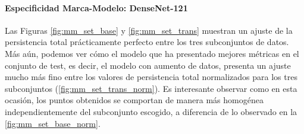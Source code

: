 \paragraph{Especificidad Marca-Modelo: DenseNet-121}

Las Figuras \ref{fig:mm_set_base} y \ref{fig:mm_set_trans} muestran un ajuste de
la persistencia total prácticamente perfecto entre los tres subconjuntos de
datos. Más aún, podemos ver cómo el modelo que ha presentado mejores métricas en
el conjunto de test, es decir, el modelo con aumento de datos, presenta un ajuste
mucho más fino entre los valores de persistencia total normalizados para los tres
subconjuntos (\autoref{fig:mm_set_trans_norm}). Es interesante observar como en
esta ocasión, los puntos obtenidos se comportan de manera más homogénea independientemente
del subconjunto escogido, a diferencia de lo observado en la
\autoref{fig:mm_set_base_norm}.

